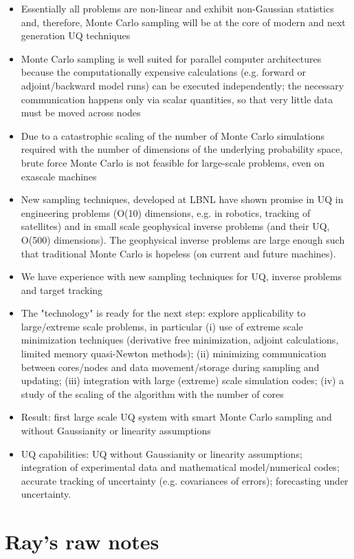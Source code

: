 \documentclass[11pt]{article}
\begin{document}
\begin{itemize}
\item Essentially all problems are non-linear and exhibit non-Gaussian statistics and, therefore, Monte Carlo sampling will be at the core of modern and next generation UQ techniques
\item Monte Carlo sampling is well suited for parallel computer architectures because the computationally expensive calculations (e.g. forward or adjoint/backward model runs) can be executed independently; the necessary communication happens only via scalar quantities, so that very little data must be moved across nodes
\item Due to a catastrophic scaling of the number of Monte Carlo simulations required with the number of dimensions of the underlying probability space, brute force Monte Carlo is not feasible for large-scale problems, even on exascale machines
\item New sampling techniques, developed at LBNL have shown promise in UQ in engineering problems (O(10) dimensions, e.g. in robotics, tracking of satellites) and in small scale geophysical inverse problems  (and their UQ, O(500) dimensions). The geophysical inverse problems are large enough such that traditional Monte Carlo is hopeless (on current and future machines).
\item We have experience with new sampling techniques for UQ, inverse problems and target tracking
\item The "technology" is ready for the next step: explore applicability to large/extreme scale problems, in particular (i) use of extreme scale minimization techniques (derivative free minimization, adjoint calculations, limited memory quasi-Newton methods); (ii) minimizing communication between cores/nodes and data movement/storage during sampling and updating; (iii) integration with large (extreme) scale simulation codes; (iv) a study of the scaling of the algorithm with the number of cores
\item Result: first large scale UQ system with smart Monte Carlo sampling and without Gaussianity or linearity assumptions
\item UQ  capabilities: UQ without Gaussianity or linearity assumptions; integration of experimental data and mathematical model/numerical codes; accurate tracking of uncertainty (e.g. covariances of errors); forecasting under uncertainty.

\end{itemize}


\section*{Ray's raw notes}
\end{document}
